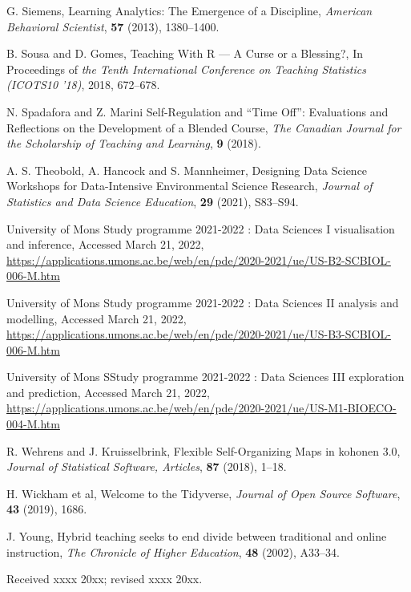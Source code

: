\documentclass{aims} %
\theoremstyle{definition}
\begin{document}
\begin{thebibliography}{99}
     \newblock G. Siemens,
     \newblock Learning Analytics: The Emergence of a Discipline,
     \newblock \emph{American Behavioral Scientist}, \textbf{57} (2013), 1380--1400.

     \newblock B. Sousa and D. Gomes,
     \newblock Teaching With R — A Curse or a Blessing?,
     \newblock In Proceedings of \emph{the Tenth International Conference on Teaching Statistics (ICOTS10 '18)}, 2018, 672–678.

     \newblock N. Spadafora and Z. Marini
     \newblock Self-Regulation and “Time Off”: Evaluations and Reflections on the Development of a Blended Course,
     \newblock \emph{The Canadian Journal for the Scholarship of Teaching and Learning}, \textbf{9} (2018).

     \newblock A. S. Theobold, A. Hancock and S. Mannheimer,
     \newblock  Designing Data Science Workshops for Data-Intensive Environmental Science Research,
     \newblock \emph{Journal of Statistics and Data Science Education}, \textbf{29} (2021), S83--S94.

    \newblock University of Mons
    \newblock Study programme 2021-2022 : Data Sciences I visualisation and inference,
    \newblock Accessed March 21, 2022,
    \newblock \url{https://applications.umons.ac.be/web/en/pde/2020-2021/ue/US-B2-SCBIOL-006-M.htm}

    \newblock University of Mons
    \newblock Study programme 2021-2022 : Data Sciences II analysis and modelling,
    \newblock Accessed March 21, 2022,
    \newblock \url{https://applications.umons.ac.be/web/en/pde/2020-2021/ue/US-B3-SCBIOL-006-M.htm}

    \newblock University of Mons
    \newblock SStudy programme 2021-2022 : Data {Sciences} {III} exploration and prediction,
    \newblock Accessed March 21, 2022,
    \newblock \url{https://applications.umons.ac.be/web/en/pde/2020-2021/ue/US-M1-BIOECO-004-M.htm}

     \newblock R. Wehrens and J. Kruisselbrink,
     \newblock  Flexible Self-Organizing Maps in kohonen 3.0,
     \newblock \emph{Journal of Statistical Software, Articles}, \textbf{87} (2018), 1--18.

     \newblock H. Wickham et al,
     \newblock  Welcome to the Tidyverse,
     \newblock \emph{Journal of Open Source Software}, \textbf{43} (2019), 1686.

     \newblock  J. Young,
     \newblock Hybrid teaching seeks to end divide between traditional and online instruction,
     \newblock \emph{The Chronicle of Higher Education}, \textbf{48} (2002), A33--34.

\end{thebibliography}

\medskip
Received xxxx 20xx; revised xxxx 20xx.
\medskip
\end{document}
